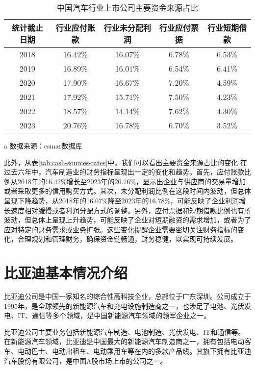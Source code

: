 \begin{table}
  \centering
  \begin{threeparttable}[c]
    \caption{中国汽车行业上市公司主要资金来源占比}
    \label{tab:cash-sources-rates}
    \begin{tabular}{ccccc}
      \toprule
         统计截止日期 & 行业应付账款 & 行业未分配利润 & 行业应付票据 & 行业短期借款 \\ 
      \midrule
        2018 & 16.42\% & 16.07\% & 6.78\% & 6.53\% \\ 
        2019 & 16.89\% & 16.01\% & 6.54\% & 6.41\% \\ 
        2020 & 17.90\% & 16.67\% & 7.20\% & 4.59\% \\
        2021 & 17.92\% & 15.71\% & 7.50\% & 4.23\% \\ 
        2022 & 18.57\% & 14.14\% & 7.62\% & 4.30\% \\ 
        2023 & 20.76\% & 16.78\% & 6.70\% & 3.52\% \\ 
      \bottomrule
    \end{tabular}
    \begin{tablenotes}
      \item [a] 数据来源：csmar数据库
    \end{tablenotes}
  \end{threeparttable}
\end{table}
此外，从表\eqref{tab:cash-sources-rates}中，我们可以看出主要资金来源占比的变化 在过去六年中，汽车制造业的财务指标呈现出一定的变化和趋势。首先，应付账款比例从2018年的16.42\%增长至2023年的20.76\%，显示出企业与供应商的交易量增加或者采取更多的信用购买方式。其次，未分配利润比例在这段时间内波动，但总体呈现下降趋势，从2018年的16.07\%降至2023年的16.78\%，可能反映了企业利润增长速度相对缓慢或者利润分配方式的调整。另外，应付票据和短期借款比例也有所波动，但总体上呈现上升趋势，可能反映了企业对短期融资的需求增加，或者为了应对特定的财务需求或业务扩张。这些变化提醒企业需要密切关注财务指标的变化，合理规划和管理财务，确保资金链畅通，财务稳健，以实现可持续发展。
\section{比亚迪基本情况介绍}
比亚迪公司是中国一家知名的综合性高科技企业，总部位于广东深圳。公司成立于1995年，是全球领先的新能源汽车和充电设施制造商之一，也涉足了电池、光伏发电、IT、通信等多个领域，是中国新能源汽车领域的领军企业之一。

比亚迪公司主要业务包括新能源汽车制造、电池制造、光伏发电、IT和通信等。在新能源汽车领域，比亚迪是中国最大的新能源汽车制造商之一，拥有包括电动客车、电动巴士、电动出租车、电动乘用车等在内的多款产品线。其旗下拥有比亚迪汽车股份有限公司，是中国A股市场上市的公司之一。

